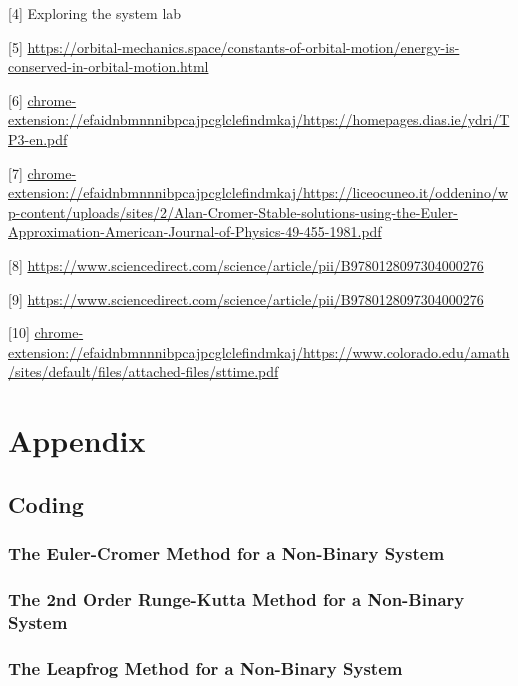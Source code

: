 \documentclass[12 pt, a4paper]{article}
\begin{document}
[4] Exploring the system lab

[5] \url{https://orbital-mechanics.space/constants-of-orbital-motion/energy-is-conserved-in-orbital-motion.html}

[6] \url{chrome-extension://efaidnbmnnnibpcajpcglclefindmkaj/https://homepages.dias.ie/ydri/TP3-en.pdf}

[7] \url{chrome-extension://efaidnbmnnnibpcajpcglclefindmkaj/https://liceocuneo.it/oddenino/wp-content/uploads/sites/2/Alan-Cromer-Stable-solutions-using-the-Euler-Approximation-American-Journal-of-Physics-49-455-1981.pdf}

[8] \url{https://www.sciencedirect.com/science/article/pii/B9780128097304000276}

[9] \url{https://www.sciencedirect.com/science/article/pii/B9780128097304000276}

[10] \url{chrome-extension://efaidnbmnnnibpcajpcglclefindmkaj/https://www.colorado.edu/amath/sites/default/files/attached-files/sttime.pdf}

\newpage
\section{Appendix}

\subsection{Coding}
\subsubsection{The Euler-Cromer Method for a Non-Binary System}


\subsubsection{The 2nd Order Runge-Kutta Method for a Non-Binary System}


\subsubsection{The Leapfrog Method for a Non-Binary System}

\end{document}
